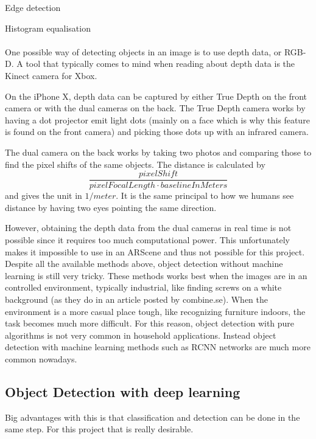Edge detection

Histogram equalisation
\\\\
One possible way of detecting objects in an image is to use depth data, or RGB-D.
A tool that typically comes to mind when reading about depth data is the Kinect camera
for Xbox.

On the iPhone X, depth data can be captured by either True Depth on the front camera or with the dual cameras on the back. The True Depth camera works by having a dot projector emit light dots (mainly on a face which is why this feature is found on the front camera) and picking those dots up with an infrared camera.

The dual camera on the back works by taking two photos and comparing those to find the pixel shifts of the same objects. The distance is calculated by \[ \frac{pixelShift} { pixelFocalLength \cdot baselineInMeters}\] and gives the unit in $1/meter$. It is the same principal to how we humans see distance by having two eyes pointing the same direction. \cite{depthMap}

However, obtaining the depth data from the dual cameras in real time is not possible since it requires too much computational power. This unfortunately makes it impossible to use in an ARScene and thus not possible for this project.\\

Despite all the available methods above, object detection without machine learning is still very tricky. These methods works best when the images are in an controlled environment, typically industrial, like finding screws on a white background (as they do in an article posted by combine.se). \cite{combine}
When the environment is a more casual place tough, like recognizing furniture indoors, the task becomes much more difficult. For this reason, object detection with pure algorithms is not very common in household applications. Instead object detection with machine learning methods such as RCNN networks are much more common nowadays.

\subsection{Object Detection with deep learning}

Big advantages with this is that classification and detection can be done in the same
 step. For this project that is really desirable.
 
